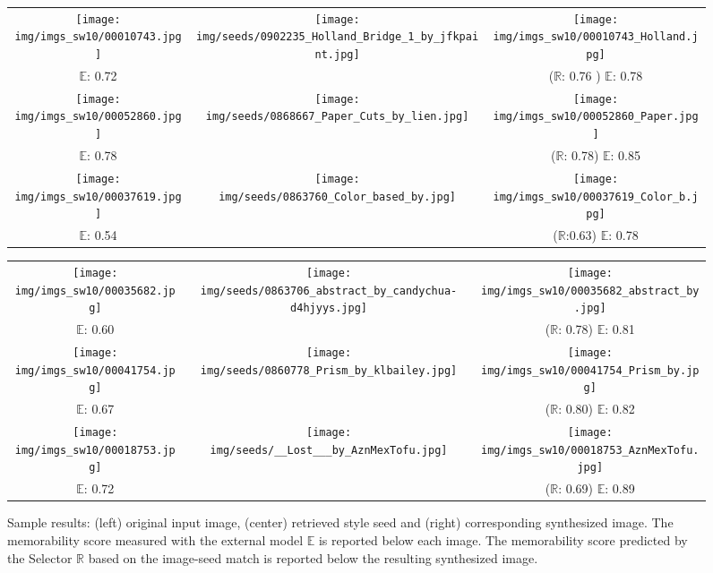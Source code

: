 \documentclass{sig-alternate-05-2015}
\begin{document}
\begin{figure*}[t]
\begin{tabular}{ccc} 
\texttt{[image: img/imgs\_sw10/00010743.jpg]} & 
\texttt{[image: img/seeds/0902235\_Holland\_Bridge\_1\_by\_jfkpaint.jpg]} & 
\texttt{[image: img/imgs\_sw10/00010743\_Holland.jpg]} 
\\
$\mathbb{E}$: 0.72 &  & ($\mathbb{R}$: 0.76 ) $\mathbb{E}$: 0.78  \\
\texttt{[image: img/imgs\_sw10/00052860.jpg]} & 
\texttt{[image: img/seeds/0868667\_Paper\_Cuts\_by\_lien.jpg]} & 
\texttt{[image: img/imgs\_sw10/00052860\_Paper.jpg]} 
\\
$\mathbb{E}$: 0.78 &  & ($\mathbb{R}$: 0.78) $\mathbb{E}$: 0.85 \\
\texttt{[image: img/imgs\_sw10/00037619.jpg]} &
\texttt{[image: img/seeds/0863760\_Color\_based\_by.jpg]} & 
\texttt{[image: img/imgs\_sw10/00037619\_Color\_b.jpg]} 
\\
$\mathbb{E}$: 0.54 &  & ($\mathbb{R}$:0.63) $\mathbb{E}$: 0.78 
\end{tabular}
\hspace{0.6cm}
\begin{tabular}{ccc} 
\texttt{[image: img/imgs\_sw10/00035682.jpg]} & 
\texttt{[image: img/seeds/0863706\_abstract\_by\_candychua-d4hjyys.jpg]} & 
\texttt{[image: img/imgs\_sw10/00035682\_abstract\_by.jpg]} 
\\
$\mathbb{E}$: 0.60 &  & ($\mathbb{R}$: 0.78) $\mathbb{E}$: 0.81   \\
\texttt{[image: img/imgs\_sw10/00041754.jpg]} & 
\texttt{[image: img/seeds/0860778\_Prism\_by\_klbailey.jpg]} & 
\texttt{[image: img/imgs\_sw10/00041754\_Prism\_by.jpg]} 
\\
$\mathbb{E}$: 0.67 &  & ($\mathbb{R}$: 0.80) $\mathbb{E}$: 0.82   \\
\texttt{[image: img/imgs\_sw10/00018753.jpg]} & 
\texttt{[image: img/seeds/\_\_Lost\_\_\_by\_AznMexTofu.jpg]} & 
\texttt{[image: img/imgs\_sw10/00018753\_AznMexTofu.jpg]} 
\\
$\mathbb{E}$: 0.72 &  & ($\mathbb{R}$: 0.69) $\mathbb{E}$: 0.89
\end{tabular}
\caption{Sample results: (left) original input image, (center) retrieved style seed and (right) corresponding synthesized image. The memorability score measured with the external model $\mathbb{E}$ is reported below each image. The memorability score predicted by the Selector $\mathbb{R}$ based on the image-seed match is reported below the resulting synthesized image.}
\label{fig:qualitative}
\end{figure*}
\end{document}
